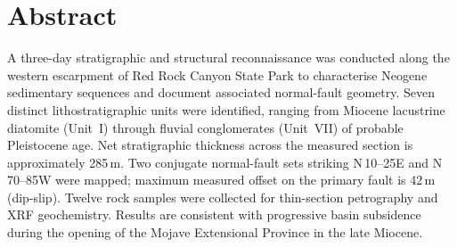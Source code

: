 \section{Abstract}

A three-day stratigraphic and structural reconnaissance was conducted along the western
escarpment of Red Rock Canyon State Park to characterise Neogene sedimentary sequences
and document associated normal-fault geometry.
Seven distinct lithostratigraphic units were identified, ranging from
Miocene lacustrine diatomite (Unit~I) through fluvial conglomerates (Unit~VII) of probable
Pleistocene age.
Net stratigraphic thickness across the measured section is approximately 285\,m.
Two conjugate normal-fault sets striking N\,10--25\textdegree{}E and
N\,70--85\textdegree{}W were mapped; maximum measured offset on the primary fault
is 42\,m (dip-slip).
Twelve rock samples were collected for thin-section petrography and
XRF geochemistry. Results are consistent with progressive basin subsidence during the
opening of the Mojave Extensional Province in the late Miocene.

